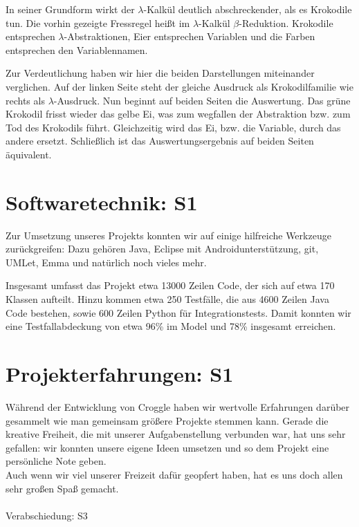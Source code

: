 \documentclass{scrartcl}
\begin{document}
	In seiner Grundform wirkt der $\lambda$-Kalkül deutlich abschreckender, als es Krokodile tun.
	Die vorhin gezeigte Fressregel heißt im $\lambda$-Kalkül $\beta$-Reduktion.
	Krokodile entsprechen $\lambda$-Abstraktionen, Eier entsprechen Variablen und die Farben entsprechen den Variablennamen.

	Zur Verdeutlichung haben wir hier die beiden Darstellungen miteinander verglichen.
	Auf der linken Seite steht der gleiche Ausdruck als Krokodilfamilie wie rechts als $\lambda$-Ausdruck.
	Nun beginnt auf beiden Seiten die Auswertung.
	Das grüne Krokodil frisst wieder das gelbe Ei, was zum wegfallen der Abstraktion bzw. zum Tod des Krokodils führt.
	Gleichzeitig wird das Ei, bzw. die Variable, durch das andere ersetzt.
	Schließlich ist das Auswertungsergebnis auf beiden Seiten äquivalent.

	\section{Softwaretechnik: S1}
	Zur Umsetzung unseres Projekts konnten wir auf einige hilfreiche Werkzeuge zurückgreifen:
	Dazu gehören Java, Eclipse mit Androidunterstützung, git, UMLet, Emma und natürlich noch vieles mehr.

	Insgesamt umfasst das Projekt etwa 13000 Zeilen Code, der sich auf etwa 170 Klassen aufteilt.
	Hinzu kommen etwa 250 Testfälle, die aus 4600 Zeilen Java Code bestehen, sowie 600 Zeilen Python für Integrationstests.
	Damit konnten wir eine Testfallabdeckung von etwa 96\% im Model und 78\% insgesamt erreichen.

	\section{Projekterfahrungen: S1}

	Während der Entwicklung von Croggle haben wir wertvolle Erfahrungen darüber gesammelt wie man gemeinsam größere Projekte stemmen kann. 
	Gerade die kreative Freiheit, die mit unserer Aufgabenstellung verbunden war, hat uns sehr gefallen: wir konnten unsere eigene Ideen umsetzen und so dem Projekt eine persönliche Note geben. \\
	Auch wenn wir viel unserer Freizeit dafür geopfert haben, hat es uns doch allen sehr großen Spaß gemacht.
\\
\ \\
	Verabschiedung: S3
     
\end{document}
